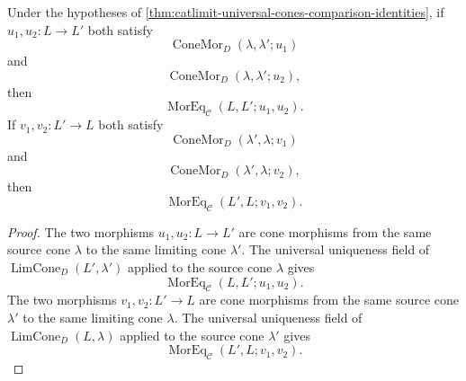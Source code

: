 \begin{corollary}\label{cor:catlimit-comparison-fiber-collapse}
Under the hypotheses of \autoref{thm:catlimit-universal-cones-comparison-identities}, if $u_1,u_2:L\to L'$ both satisfy
$$\operatorname{ConeMor}_{D}(\lambda,\lambda';u_1)$$
and
$$\operatorname{ConeMor}_{D}(\lambda,\lambda';u_2),$$
then
$$\operatorname{MorEq}_{\mathcal C}(L,L';u_1,u_2).$$
If $v_1,v_2:L'\to L$ both satisfy
$$\operatorname{ConeMor}_{D}(\lambda',\lambda;v_1)$$
and
$$\operatorname{ConeMor}_{D}(\lambda',\lambda;v_2),$$
then
$$\operatorname{MorEq}_{\mathcal C}(L',L;v_1,v_2).$$
\end{corollary}
\begin{proof}
The two morphisms $u_1,u_2:L\to L'$ are cone morphisms from the same source cone $\lambda$ to the same limiting cone $\lambda'$. The universal uniqueness field of $\operatorname{LimCone}_{D}(L',\lambda')$ applied to the source cone $\lambda$ gives
$$\operatorname{MorEq}_{\mathcal C}(L,L';u_1,u_2).$$
The two morphisms $v_1,v_2:L'\to L$ are cone morphisms from the same source cone $\lambda'$ to the same limiting cone $\lambda$. The universal uniqueness field of $\operatorname{LimCone}_{D}(L,\lambda)$ applied to the source cone $\lambda'$ gives
$$\operatorname{MorEq}_{\mathcal C}(L',L;v_1,v_2).$$
\end{proof}

